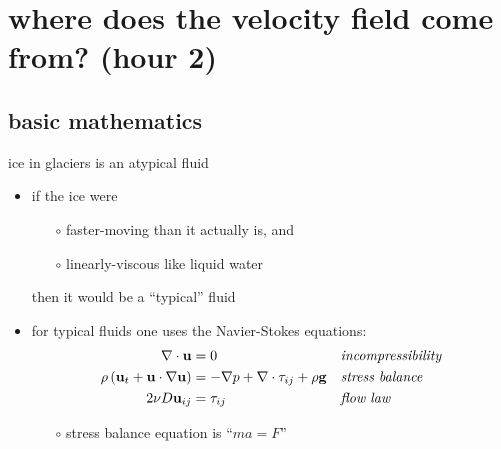 \documentclass[10pt]{beamer}
\begin{document}
\section[where does the velocity field come from?]{\textbf{where does the velocity field come from?} (hour 2)}

\subsection{basic mathematics}

\begin{frame}{ice in glaciers is an atypical fluid}

\begin{itemize}
\item if the ice were
  \begin{itemize}
  \item[$\circ$] faster-moving than it actually is, and
  \item[$\circ$] linearly-viscous like liquid water
  \end{itemize}

  then it would be a ``typical'' fluid

\bigskip
\item for typical fluids one uses the Navier-Stokes equations:
\begin{align*}
\nabla \cdot \mathbf{u} &= 0 &&\text{\emph{incompressibility}} \\
\rho \left(\mathbf{u}_t + \mathbf{u}\cdot\nabla \mathbf{u}\right) &= -\nabla p + \nabla \cdot \tau_{ij} + \rho \mathbf{g} &&\text{\emph{stress balance}} \\
2 \nu D\mathbf{u}_{ij} &= \tau_{ij} &&\text{\emph{flow law}}
\end{align*}

\medskip
    \begin{itemize}
    \item[$\circ$] stress balance equation is ``$m a = F$''
    \end{itemize}
\end{itemize}
\end{frame}
\end{document}
